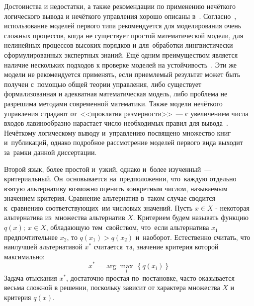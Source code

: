 Достоинства и недостатки, а также рекомендации по применению нечёткого логического вывода и нечёткого управления хорошо описаны в~\cite{Bauer_Winkler}. Согласно~\cite{Bauer_Winkler}, использование моделей первого типа рекомендуется для моделирования очень сложных процессов, когда не существует простой математической модели, для нелинейных процессов высоких порядков и для~обработки лингвистически сформулированных экспертных знаний. Ещё одним преимуществом является наличие нескольких подходов к проверке моделей на устойчивость~\cite{Pegat}. Эти же модели не рекомендуется применять, если приемлемый результат может быть получен с~помощью общей теории управления, либо существует формализованная и адекватная математическая модель, либо проблема не разрешима методами современной математики. Также модели нечёткого управления страдают от~<<проклятия размерности>>~--- с увеличением числа входов лавинообразно нарастает число необходимых правил для вывода~\cite{Pegat}. Нечёткому логическому выводу и~управлению посвящено множество книг и~публикаций, однако подробное рассмотрение моделей первого вида выходит за~рамки данной диссертации.

Второй язык, более простой и~узкий, однако и~более изученный~--- критериальный. Он~основывается на~предположении, что~каждую отдельно взятую альтернативу возможно оценить конкретным числом, называемым значением критерия. Сравнение альтернатив в~таком случае сводится к~сравнению соответствующих~им числовых значений. Пусть $x\in X$ - некоторая альтернатива из~множества альтернатив $X$. Критерием будем называть функцию $q\left( x \right);\ x\in X$, обладающую тем~свойством, что~если альтернатива ${x_1}$ предпочтительнее ${x_2}$, то $q\left( x_1 \right)>q\left( x_2 \right)$ и~наоборот. Естественно считать, что наилучшей альтернативой ${{x}^{*}}$ считается~та, значение критерия которой максимально:
\begin{equation*}
  x^{*}=\arg \underset{i}{\mathop{\max }}\,\left\{ q\left( x_i \right) \right\}
\end{equation*}
Задача отыскания $x^{*}$, достаточно простая по~постановке, часто оказывается весьма сложной в решении, поскольку зависит от характера множества $X$ и критерия $q\left( x \right)$. 

